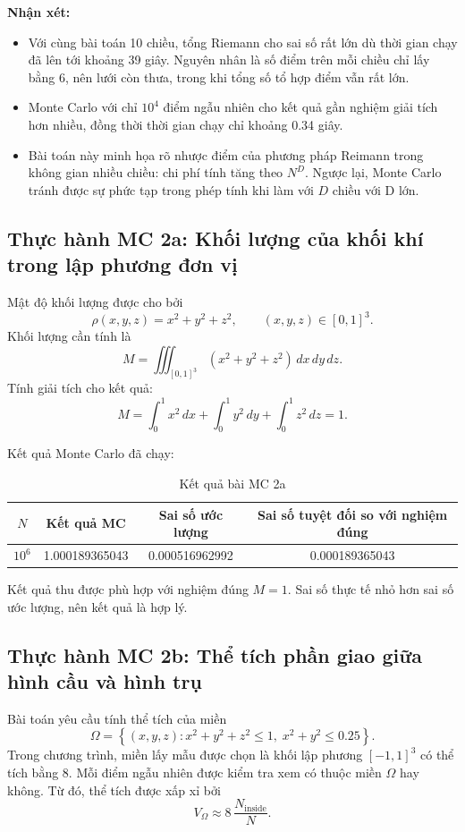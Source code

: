 \documentclass{article}
\begin{document}
\textbf{Nhận xét:}
\begin{itemize}
    \item Với cùng bài toán 10 chiều, tổng Riemann cho sai số rất lớn dù thời gian chạy đã lên tới khoảng 39 giây. Nguyên nhân là số điểm trên mỗi chiều chỉ lấy bằng 6, nên lưới còn thưa, trong khi tổng số tổ hợp điểm vẫn rất lớn.
    \item Monte Carlo với chỉ $10^4$ điểm ngẫu nhiên cho kết quả gần nghiệm giải tích hơn nhiều, đồng thời thời gian chạy chỉ khoảng 0.34 giây.
    \item Bài toán này minh họa rõ nhược điểm của phương pháp Reimann trong không gian nhiều chiều: chi phí tính tăng theo $N^D$. Ngược lại, Monte Carlo tránh được sự phức tạp trong phép tính khi làm với $D$ chiều với D lớn.
\end{itemize}

\subsection{Thực hành MC 2a: Khối lượng của khối khí trong lập phương đơn vị}

Mật độ khối lượng được cho bởi
\[
\rho(x,y,z) = x^2 + y^2 + z^2,
\qquad (x,y,z)\in[0,1]^3.
\]
Khối lượng cần tính là
\[
M = \iiint_{[0,1]^3} (x^2 + y^2 + z^2)\,dx\,dy\,dz.
\]
Tính giải tích cho kết quả:
\[
M = \int_0^1 x^2\,dx + \int_0^1 y^2\,dy + \int_0^1 z^2\,dz = 1.
\]

Kết quả Monte Carlo đã chạy:
\begin{table}[H]
\centering
\caption{Kết quả bài MC 2a}
\label{tab:mc2a}
\begin{tabular}{cccc}
\toprule
$N$ & Kết quả MC & Sai số ước lượng & Sai số tuyệt đối so với nghiệm đúng \\
\midrule
$10^6$ & 1.000189365043 & 0.000516962992 & 0.000189365043 \\
\bottomrule
\end{tabular}
\end{table}

Kết quả thu được phù hợp với nghiệm đúng $M=1$. Sai số thực tế nhỏ hơn sai số ước lượng, nên kết quả là hợp lý.

\subsection{Thực hành MC 2b: Thể tích phần giao giữa hình cầu và hình trụ}

Bài toán yêu cầu tính thể tích của miền
\[
\Omega = \left\{(x,y,z): x^2+y^2+z^2\le 1,\; x^2+y^2\le 0.25\right\}.
\]
Trong chương trình, miền lấy mẫu được chọn là khối lập phương $[-1,1]^3$ có thể tích bằng 8. Mỗi điểm ngẫu nhiên được kiểm tra xem có thuộc miền $\Omega$ hay không. Từ đó, thể tích được xấp xỉ bởi
\[
V_{\Omega} \approx 8\,\frac{N_{\mathrm{inside}}}{N}.
\]
\end{document}
